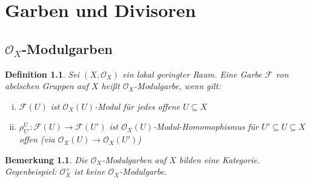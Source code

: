 \documentclass[paper = A4, fontsize=12pt, numbers=noendperiod, chapterprefix=true]{scrbook}
\theoremstyle{break}
\newtheorem{Def}{Definition}[section]
\theoremstyle{nonumberbreak}
\newtheorem{bem}{Bemerkung}
\theoremstyle{nonumberplain}
\newcommand{\quot}[1]{\textrm{\glqq}{#1}\textrm{\grqq}}
\newcommand{\calF}{\mathcal{F}}
\newcommand{\calO}{\mathcal{O}}
\newcommand{\X}{\times}
\begin{document}
\chapter{Garben und Divisoren}
\setcounter{section}{8}


\section{$\calO_X$-Modulgarben}

\begin{Def}
Sei $(X, \calO_X)$ ein lokal geringter Raum. Eine Garbe $\calF$ von abelschen Gruppen auf $X$ hei\ss t $\calO_X$-Modulgarbe, wenn gilt:
\begin{enumerate}[(i)]
\item
	$\calF(U)$ \quot{ist} $\calO_X(U)$-Modul f\"ur jedes offene $U \subseteq X$
\item
	$\rho_{U'}^U: \calF(U) \to \calF(U')$ ist $\calO_X(U)$-Modul-Homomophismus f\"ur $U' \subseteq U \subseteq X$ offen (via $\calO_X(U) \to \calO_X(U')$)
\end{enumerate}\end{Def}

\begin{bem}
Die $\calO_X$-Modulgarben auf $X$ bilden eine Kategorie. Gegenbeispiel: $\calO_X^\X$ ist \emph{keine} $\calO_X$-Modulgarbe.
\end{bem}
\end{document}
